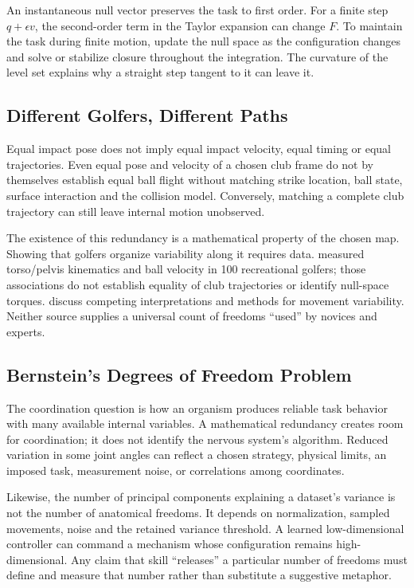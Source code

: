 An instantaneous null vector preserves the task to first order. For a finite step $q+\epsilon v$, the second-order term in the Taylor expansion can change $F$. To maintain the task during finite motion, update the null space as the configuration changes and solve or stabilize closure throughout the integration. The curvature of the level set explains why a straight step tangent to it can leave it.

\subsection{Different Golfers, Different Paths}
\label{princ:prin:ch23_motor_equivalence}

Equal impact pose does not imply equal impact velocity, equal timing or equal trajectories. Even equal pose and velocity of a chosen club frame do not by themselves establish equal ball flight without matching strike location, ball state, surface interaction and the collision model. Conversely, matching a complete club trajectory can still leave internal motion unobserved.

The existence of this redundancy is a mathematical property of the chosen map. Showing that golfers organize variability along it requires data. \citet{Myers2008} measured torso/pelvis kinematics and ball velocity in 100 recreational golfers; those associations do not establish equality of club trajectories or identify null-space torques. \citet{Glazier2011} discuss competing interpretations and methods for movement variability. Neither source supplies a universal count of freedoms ``used'' by novices and experts.

\subsection{Bernstein's Degrees of Freedom Problem}
\label{laymans:box:ch23_freezing_freeing}
\label{def:ch23_bernstein_problem}

The coordination question is how an organism produces reliable task behavior with many available internal variables. A mathematical redundancy creates room for coordination; it does not identify the nervous system's algorithm. Reduced variation in some joint angles can reflect a chosen strategy, physical limits, an imposed task, measurement noise, or correlations among coordinates.

Likewise, the number of principal components explaining a dataset's variance is not the number of anatomical freedoms. It depends on normalization, sampled movements, noise and the retained variance threshold. A learned low-dimensional controller can command a mechanism whose configuration remains high-dimensional. Any claim that skill ``releases'' a particular number of freedoms must define and measure that number rather than substitute a suggestive metaphor.

